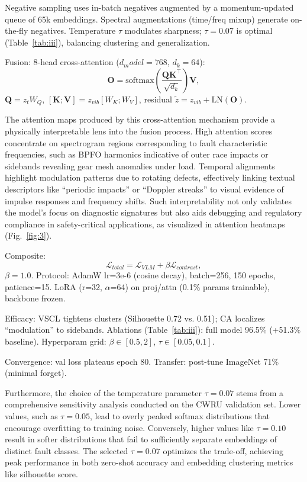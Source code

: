 Negative sampling uses in-batch negatives augmented by a momentum-updated queue of 65k embeddings. Spectral augmentations (time/freq mixup) generate on-the-fly negatives. Temperature $\tau$ modulates sharpness; $\tau=0.07$ is optimal (Table~\ref{tab:iii}), balancing clustering and generalization.

Fusion: 8-head cross-attention ($d_model=768$, $d_k=64$):
\begin{equation}
\mathbf{O} = \mathrm{softmax}\left( \frac{\mathbf{Q} \mathbf{K}^\top}{\sqrt{d_k}} \right) \mathbf{V},
\label{eq:f5}
\end{equation}
$\mathbf{Q} = z_t W_Q$, $[\mathbf{K}; \mathbf{V}] = z_{vib} [W_K; W_V]$, residual $\tilde{z} = z_{vib} + \mathrm{LN}(\mathbf{O})$.

The attention maps produced by this cross-attention mechanism provide a physically interpretable lens into the fusion process. High attention scores concentrate on spectrogram regions corresponding to fault characteristic frequencies, such as BPFO harmonics indicative of outer race impacts or sidebands revealing gear mesh anomalies under load. Temporal alignments highlight modulation patterns due to rotating defects, effectively linking textual descriptors like ``periodic impacts'' or ``Doppler streaks'' to visual evidence of impulse responses and frequency shifts. Such interpretability not only validates the model's focus on diagnostic signatures but also aids debugging and regulatory compliance in safety-critical applications, as visualized in attention heatmaps (Fig.~\ref{fig:3}).

Composite:
\begin{equation}
\mathcal{L}_{total} = \mathcal{L}_{VLM} + \beta \mathcal{L}_{contrast},
\label{eq:f6}
\end{equation}
$\beta=1.0$. Protocol: AdamW lr=3e-6 (cosine decay), batch=256, 150 epochs, patience=15. LoRA (r=32, $\alpha$=64) on proj/attn (0.1\% params trainable), backbone frozen.

Efficacy: VSCL tightens clusters (Silhouette 0.72 vs. 0.51); CA localizes ``modulation'' to sidebands. Ablations (Table~\ref{tab:iii}): full model 96.5\% (+51.3\% baseline). Hyperparam grid: $\beta\in[0.5,2]$, $\tau\in[0.05,0.1]$.

Convergence: val loss plateaus epoch 80. Transfer: post-tune ImageNet 71\% (minimal forget).

Furthermore, the choice of the temperature parameter $\tau = 0.07$ stems from a comprehensive sensitivity analysis conducted on the CWRU validation set. Lower values, such as $\tau = 0.05$, lead to overly peaked softmax distributions that encourage overfitting to training noise. Conversely, higher values like $\tau = 0.10$ result in softer distributions that fail to sufficiently separate embeddings of distinct fault classes. The selected $\tau = 0.07$ optimizes the trade-off, achieving peak performance in both zero-shot accuracy and embedding clustering metrics like silhouette score.

